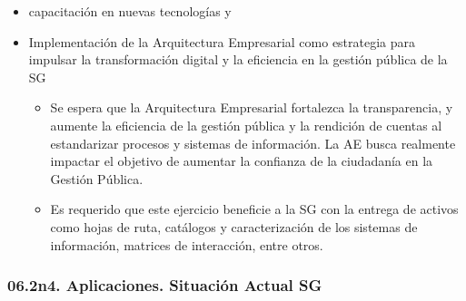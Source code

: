 \documentclass[
	a4paper, %
	12pt, %
]{include/CSSullivanBusinessReport}
\def\tightlist{}
\begin{document}
\begin{itemize}
  \begin{itemize}
  \tightlist
  \item
    Se busca la consolidación de herramientas, canales e información
    para fortalecer la oferta y celeridad de servicios y la
    participación ciudadana. Esto incluye el seguimiento a canales de
    atención virtual como SuperCADE Virtual, chat, chat-Bot y (video)
    llamadas de la línea 195.
  \item
    Se busca optimizar los procesos de recolección, análisis y
    divulgación de la información mediante la implementación de sistemas
    de información que incluyan la automatización de la recolección de
    datos y el uso de herramientas analíticas.
  \item
    Es destacado que el Distrito unifica en el portal Bogotá su oferta
    de trámites y servicios, como el realizar pagos en línea (no
    tributarios) y agendamiento de citas en la RedCADE desde casa;
    esfuerzo que debe continuar y extenderse a los más de 1.400 trámites
    y servicios. Esto representa una mejora significativa en la
    accesibilidad y eficiencia de los servicios digitales para la
    ciudadanía.
  \end{itemize}
\item
  capacitación en nuevas tecnologías y
\item
  Implementación de la Arquitectura Empresarial como estrategia para
  impulsar la transformación digital y la eficiencia en la gestión
  pública de la SG

  \begin{itemize}
  \tightlist
  \item
    Se espera que la Arquitectura Empresarial fortalezca la
    transparencia, y aumente la eficiencia de la gestión pública y la
    rendición de cuentas al estandarizar procesos y sistemas de
    información. La AE busca realmente impactar el objetivo de aumentar
    la confianza de la ciudadanía en la Gestión Pública.
  \item
    Es requerido que este ejercicio beneficie a la SG con la entrega de
    activos como hojas de ruta, catálogos y caracterización de los
    sistemas de información, matrices de interacción, entre otros.
  \end{itemize}
\end{itemize}

\subsubsection{06.2n4. Aplicaciones. Situación Actual
SG}\label{sec:n4.-aplicaciones.-situaciuxf3n-actual-sg}
\end{document}
